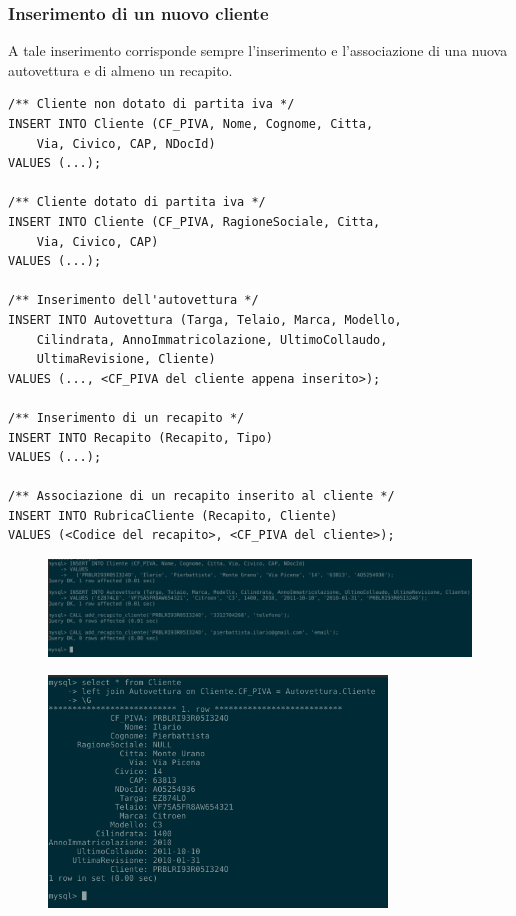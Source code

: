 		\subsubsection{Inserimento di un nuovo cliente}
			A tale inserimento corrisponde sempre l'inserimento e l'associazione di una nuova autovettura e di almeno un recapito.
				\begin{lstlisting}
/** Cliente non dotato di partita iva */
INSERT INTO Cliente (CF_PIVA, Nome, Cognome, Citta, 
	Via, Civico, CAP, NDocId) 
VALUES (...);

/** Cliente dotato di partita iva */
INSERT INTO Cliente (CF_PIVA, RagioneSociale, Citta, 
	Via, Civico, CAP) 
VALUES (...);

/** Inserimento dell'autovettura */
INSERT INTO Autovettura (Targa, Telaio, Marca, Modello, 
	Cilindrata, AnnoImmatricolazione, UltimoCollaudo, 
	UltimaRevisione, Cliente) 
VALUES (..., <CF_PIVA del cliente appena inserito>);

/** Inserimento di un recapito */
INSERT INTO Recapito (Recapito, Tipo)
VALUES (...);

/** Associazione di un recapito inserito al cliente */
INSERT INTO RubricaCliente (Recapito, Cliente)
VALUES (<Codice del recapito>, <CF_PIVA del cliente>);
				\end{lstlisting}

        \begin{figure}[H]
          \centering
          \includegraphics[width=15cm]{images/screenshots/nuovo_cliente.png}
        \end{figure}

        \begin{figure}[H]
          \centering
          \includegraphics[width=9cm]{images/screenshots/show_cliente_autovettura.png}
        \end{figure}

